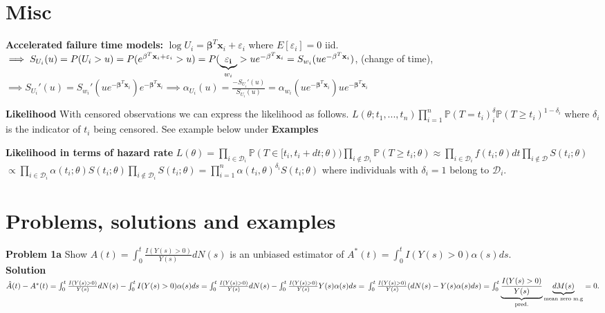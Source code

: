 \documentclass{article}
\begin{document}
\medskip

\newpage

\section*{Misc}

\textbf{Accelerated failure time models:} $\log U_i = \mathbf{\beta}^T\mathbf{x}_i + \varepsilon_i$ where $E[\varepsilon_i]=0$ iid. $\implies S_{U_i}(u)=P(U_i>u)=P(e^{\mathbf{\beta}^T\mathbf{x}_i + \varepsilon_i}>u) = \\ P(\underbrace{\mathbf{\varepsilon_i}}_{w_i} > ue^{-\mathbf{\beta}^T\mathbf{x}_i} = S_{w_i}(ue^{-\mathbf{\beta}^T\mathbf{x}_i})$, (change of time), $\implies S_{U_i}'(u) = S_{w_i}'(ue^{-\mathbf{\beta}^T\mathbf{x}_i})e^{-\mathbf{\beta}^T\mathbf{x}_i} \implies \alpha_{U_i}(u) = \frac{-S_{U_i}'(u)}{S_{U_i}(u)} = \alpha_{w_i}(ue^{-\mathbf{\beta}^T\mathbf{x}_i})ue^{-\mathbf{\beta}^T\mathbf{x}_i}$

\medskip

\textbf{Likelihood} With censored observations we can express the likelihood as follows. $L(\theta; t_1,...,t_n)\prod_{i=1}^n \mathbb{P}(T = t_i)^\delta_i \mathbb{P}(T \geq t_i)^{1-\delta_i}$ where $\delta_i$ is the indicator of $t_i$ being censored. See example below under \textbf{Examples}

\medskip

\textbf{Likelihood in terms of hazard rate} $L(\theta) = \prod_{i\in \mathcal{D}_i}\mathbb{P}(T\in[t_i, t_i +dt;\theta))\prod_{i\notin \mathcal{D}_i}\mathbb{P}(T\geq t_i; \theta) \approx \prod_{i \in \mathcal{D}_i} f(t_i;\theta)dt\prod_{i \notin \mathcal{D}} S(t_i; \theta)$ \newline $\propto \prod_{i\in \mathcal{D}_i}\alpha(t_i;\theta)S(t_i;\theta)\prod_{i\notin \mathcal{D}_i}S(t_i;\theta) = \prod_{i=1}^n \alpha(t_i,\theta)^{\delta_i}S(t_i;\theta)$ where individuals with $\delta_i = 1$ belong to $\mathcal{D}_i$.

\medskip

\section*{Problems, solutions and examples} 

\textbf{Problem 1a} Show $\hat{A}(t) = \int_0^t \frac{I(Y(s)>0)}{Y(s)} dN(s)$ is an unbiased estimator of $A^*(t) = \int_0^t I(Y(s)>0)\alpha(s)ds$. \\
\textbf{Solution} $\hat{A}(t) - A^*(t)= \int_0^t \frac{I(Y(s)>0)}{Y(s)} dN(s) - \int_0^t I(Y(s)>0)\alpha(s)ds = \int_0^t \frac{I(Y(s)>0)}{Y(s)} dN(s) - \int_0^t \frac{I(Y(s)>0)}{Y(s)} Y(s)\alpha(s)ds = \\
\int_0^t \frac{I(Y(s)>0)}{Y(s)} (dN(s) - Y(s)\alpha(s)ds) =
\int_0^t \underbrace{\frac{I(Y(s)>0)}{Y(s)}}_{\text{pred.}} \underbrace{dM(s)}_{\text{mean zero m.g}} = 0.
$ 
\end{document}
